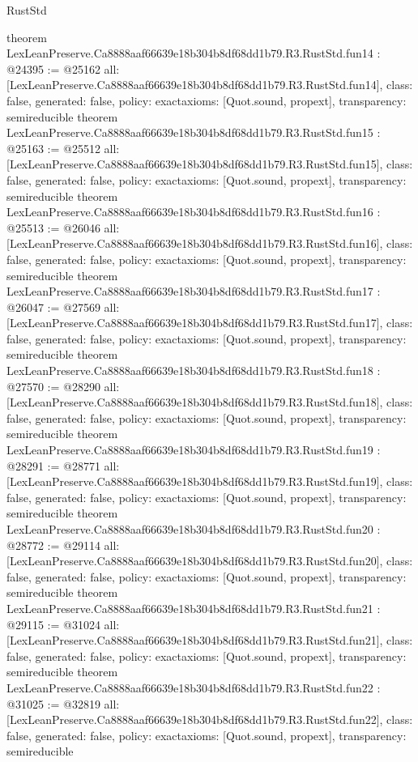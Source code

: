 \begin{lexlean}{RustStd}
\begin{coremodule}
{}
theorem LexLeanPreserve.Ca8888aaf66639e18b304b8df68dd1b79.R3.RustStd.fun14 : @24395 := @25162 {
  all: [LexLeanPreserve.Ca8888aaf66639e18b304b8df68dd1b79.R3.RustStd.fun14],
  class: false,
  generated: false,
  policy: exact{axioms: [Quot.sound, propext]},
  transparency: semireducible
}
theorem LexLeanPreserve.Ca8888aaf66639e18b304b8df68dd1b79.R3.RustStd.fun15 : @25163 := @25512 {
  all: [LexLeanPreserve.Ca8888aaf66639e18b304b8df68dd1b79.R3.RustStd.fun15],
  class: false,
  generated: false,
  policy: exact{axioms: [Quot.sound, propext]},
  transparency: semireducible
}
theorem LexLeanPreserve.Ca8888aaf66639e18b304b8df68dd1b79.R3.RustStd.fun16 : @25513 := @26046 {
  all: [LexLeanPreserve.Ca8888aaf66639e18b304b8df68dd1b79.R3.RustStd.fun16],
  class: false,
  generated: false,
  policy: exact{axioms: [Quot.sound, propext]},
  transparency: semireducible
}
theorem LexLeanPreserve.Ca8888aaf66639e18b304b8df68dd1b79.R3.RustStd.fun17 : @26047 := @27569 {
  all: [LexLeanPreserve.Ca8888aaf66639e18b304b8df68dd1b79.R3.RustStd.fun17],
  class: false,
  generated: false,
  policy: exact{axioms: [Quot.sound, propext]},
  transparency: semireducible
}
theorem LexLeanPreserve.Ca8888aaf66639e18b304b8df68dd1b79.R3.RustStd.fun18 : @27570 := @28290 {
  all: [LexLeanPreserve.Ca8888aaf66639e18b304b8df68dd1b79.R3.RustStd.fun18],
  class: false,
  generated: false,
  policy: exact{axioms: [Quot.sound, propext]},
  transparency: semireducible
}
theorem LexLeanPreserve.Ca8888aaf66639e18b304b8df68dd1b79.R3.RustStd.fun19 : @28291 := @28771 {
  all: [LexLeanPreserve.Ca8888aaf66639e18b304b8df68dd1b79.R3.RustStd.fun19],
  class: false,
  generated: false,
  policy: exact{axioms: [Quot.sound, propext]},
  transparency: semireducible
}
theorem LexLeanPreserve.Ca8888aaf66639e18b304b8df68dd1b79.R3.RustStd.fun20 : @28772 := @29114 {
  all: [LexLeanPreserve.Ca8888aaf66639e18b304b8df68dd1b79.R3.RustStd.fun20],
  class: false,
  generated: false,
  policy: exact{axioms: [Quot.sound, propext]},
  transparency: semireducible
}
theorem LexLeanPreserve.Ca8888aaf66639e18b304b8df68dd1b79.R3.RustStd.fun21 : @29115 := @31024 {
  all: [LexLeanPreserve.Ca8888aaf66639e18b304b8df68dd1b79.R3.RustStd.fun21],
  class: false,
  generated: false,
  policy: exact{axioms: [Quot.sound, propext]},
  transparency: semireducible
}
theorem LexLeanPreserve.Ca8888aaf66639e18b304b8df68dd1b79.R3.RustStd.fun22 : @31025 := @32819 {
  all: [LexLeanPreserve.Ca8888aaf66639e18b304b8df68dd1b79.R3.RustStd.fun22],
  class: false,
  generated: false,
  policy: exact{axioms: [Quot.sound, propext]},
  transparency: semireducible
}
\end{coremodule}
\end{lexlean}
